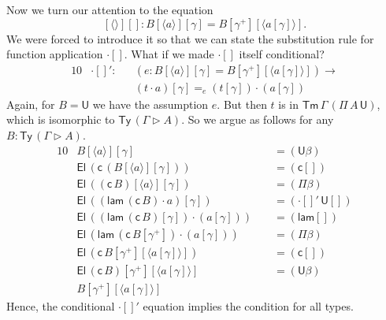 \documentclass[sigplan,10pt,anonymous,review]{acmart}\settopmatter{printfolios=true,printccs=false,printacmref=false}
\newcommand{\ra}{\rightarrow}
\newcommand{\Ty}{\mathsf{Ty}}
\newcommand{\Tm}{\mathsf{Tm}}
\newcommand{\ext}{\mathop{\triangleright}}
\newcommand{\lam}{\mathsf{lam}}
\newcommand{\U}{\mathsf{U}}
\newcommand{\El}{\mathsf{El}}
\newcommand{\cd}{\mathsf{c}}
\begin{document}
Now we turn our attention to the equation
\[
  [\langle\rangle][] : B[\langle a\rangle][\gamma] = B[\gamma^+][\langle a[\gamma]\rangle].
\]
We were forced to introduce it so that we can state the substitution
rule for function application $\cdot[]$. What if we made $\cdot[]$
itself conditional?
\begin{alignat*}{10}
  & \cdot[]' :{} && (e : B[\langle a\rangle][\gamma] = B[\gamma^+][\langle a[\gamma]\rangle])\ra \\
  & && (t\cdot a)[\gamma] =_e (t[\gamma])\cdot(a[\gamma])
\end{alignat*}
Again, for $B = \U$ we have the assumption $e$. But then $t$ is in
$\Tm\,\Gamma\,(\Pi\,A\,\U)$, which is isomorphic to $\Ty\,(\Gamma\ext
A)$. So we argue as follows for any $B : \Ty\,(\Gamma\ext A)$.
\begin{alignat*}{10}
  & B[\langle a\rangle][\gamma] && {=}(\U\beta) \\
  & \El\,(\cd\,(B[\langle a\rangle][\gamma])) && {=}(\cd[]) \\
  & \El\,((\cd\,B)[\langle a\rangle][\gamma]) && {=}(\Pi\beta) \\
  & \El\,((\lam\,(\cd\,B)\cdot a)[\gamma]) && {=}(\cdot[]'\,\U[]) \\
  & \El\,((\lam\,(\cd\,B)[\gamma])\cdot (a[\gamma]))\,\, && {=}(\lam[]) \\
  & \El\,(\lam\,(\cd\,B[\gamma^+])\cdot (a[\gamma])) && {=}(\Pi\beta) \\
  & \El\,(\cd\,B[\gamma^+][\langle a[\gamma]\rangle]) && {=}(\cd[]) \\
  & \El\,(\cd\,B)[\gamma^+][\langle a[\gamma]\rangle] && {=}(\U\beta) \\
  & B[\gamma^+][\langle a[\gamma]\rangle]
\end{alignat*}
Hence, the conditional $\cdot[]'$ equation implies the condition for
all types.
\end{document}
